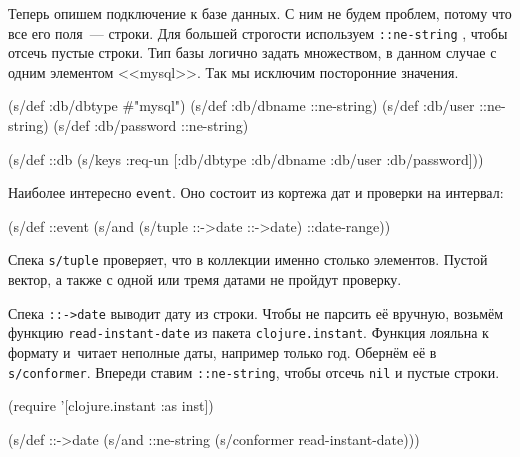 
Теперь опишем подключение к базе данных. С ним не будем проблем, потому что все
его поля~--- строки. Для большей строгости используем \verb|::ne-string| ,
чтобы отсечь пустые строки. Тип базы логично задать множеством, в данном
случае с одним элементом <<mysql>>. Так мы исключим посторонние значения.

\begin{english}
  \begin{clojure}
(s/def :db/dbtype   #{"mysql"})
(s/def :db/dbname   ::ne-string)
(s/def :db/user     ::ne-string)
(s/def :db/password ::ne-string)

(s/def ::db
  (s/keys :req-un [:db/dbtype
                   :db/dbname
                   :db/user
                   :db/password]))
  \end{clojure}
\end{english}

Наиболее интересно \verb|event|. Оно состоит из кортежа дат и проверки на
интервал:

\begin{english}
  \begin{clojure}
(s/def ::event
  (s/and (s/tuple ::->date ::->date)
         ::date-range))
  \end{clojure}
\end{english}


Спека \verb|s/tuple| проверяет, что в коллекции именно столько элементов. Пустой
вектор, а также с одной или тремя датами не пройдут проверку.

Спека \verb|::->date| выводит дату из строки. Чтобы не парсить её вручную,
возьмём функцию \verb|read-instant-date| из пакета \verb|clojure.instant|.
Функция лояльна к формату и~читает неполные даты, например только год.  Обернём
её в \verb|s/conformer|. Впереди ставим \verb|::ne-string|, чтобы отсечь
\verb|nil| и пустые строки.


\ifnarrow

\begin{english}
  \begin{clojure}
(require '[clojure.instant :as inst])

(s/def ::->date
  (s/and ::ne-string
    (s/conformer read-instant-date)))
  \end{clojure}
\end{english}

